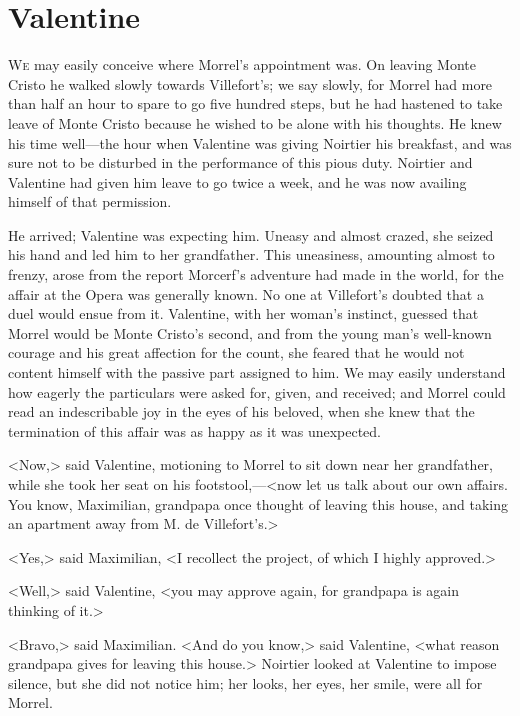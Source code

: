 \chapter{Valentine} 

 \lettrine{W}{e} may easily conceive where Morrel's appointment was. On leaving Monte Cristo he walked slowly towards Villefort's; we say slowly, for Morrel had more than half an hour to spare to go five hundred steps, but he had hastened to take leave of Monte Cristo because he wished to be alone with his thoughts. He knew his time well—the hour when Valentine was giving Noirtier his breakfast, and was sure not to be disturbed in the performance of this pious duty. Noirtier and Valentine had given him leave to go twice a week, and he was now availing himself of that permission. 

 He arrived; Valentine was expecting him. Uneasy and almost crazed, she seized his hand and led him to her grandfather. This uneasiness, amounting almost to frenzy, arose from the report Morcerf's adventure had made in the world, for the affair at the Opera was generally known. No one at Villefort's doubted that a duel would ensue from it. Valentine, with her woman's instinct, guessed that Morrel would be Monte Cristo's second, and from the young man's well-known courage and his great affection for the count, she feared that he would not content himself with the passive part assigned to him. We may easily understand how eagerly the particulars were asked for, given, and received; and Morrel could read an indescribable joy in the eyes of his beloved, when she knew that the termination of this affair was as happy as it was unexpected. 

 <Now,> said Valentine, motioning to Morrel to sit down near her grandfather, while she took her seat on his footstool,—<now let us talk about our own affairs. You know, Maximilian, grandpapa once thought of leaving this house, and taking an apartment away from M. de Villefort's.> 

 <Yes,> said Maximilian, <I recollect the project, of which I highly approved.> 

 <Well,> said Valentine, <you may approve again, for grandpapa is again thinking of it.> 

 <Bravo,> said Maximilian.  <And do you know,> said Valentine, <what reason grandpapa gives for leaving this house.> Noirtier looked at Valentine to impose silence, but she did not notice him; her looks, her eyes, her smile, were all for Morrel. 

